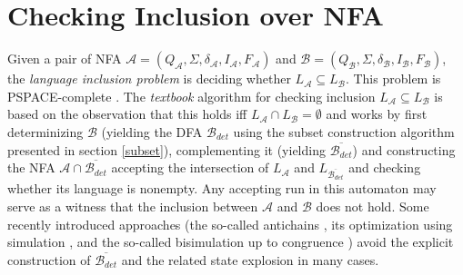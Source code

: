 \chapter{Checking Inclusion over NFA}
\label{chapInclusion}
Given a pair of NFA $\mathcal{A}=(Q_\mathcal{A},\Sigma,\delta_\mathcal{A},I_\mathcal{A},F_\mathcal{A})$ 
and $\mathcal{B}=(Q_\mathcal{B},\Sigma,\delta_\mathcal{B},I_\mathcal{B},F_\mathcal{B})$, 
the \emph{language inclusion problem} is deciding whether $L_\mathcal{A} \subseteq L_\mathcal{B}$.
This problem is PSPACE-complete \cite{cav06}. The \emph{textbook} algorithm for checking inclusion $L_\mathcal{A}\subseteq L_\mathcal{B}$ 
is based on the observation that this holds iff $L_{\mathcal{A}}\cap L_\mathcal{B}=\emptyset$ and works by first 
determinizing $\mathcal{B}$ (yielding the DFA 
$\mathcal{B}_{det}$ using the subset construction algorithm presented in section \ref{subset}), 
complementing it (yielding $\overline{\mathcal{B}_{det}}$) and constructing the NFA $\mathcal{A} \cap \overline{\mathcal{B}_{det}}$ 
accepting the intersection of $L_{\mathcal{A}}$ and ${L_{\overline{\mathcal{B}_{det}}}}$ and
checking whether its language is nonempty. Any accepting run in this automaton may serve as a witness that the inclusion between $\mathcal{A}$ 
and $\mathcal{B}$ does not hold.
Some recently introduced approaches (the so-called antichains \cite{cav06}, its optimization using simulation \cite{tacas10}, and the so-called bisimulation up to
congruence \cite{popl13}) avoid the explicit construction of $\overline{\mathcal{B}_{det}}$ and the related state explosion in many cases.

